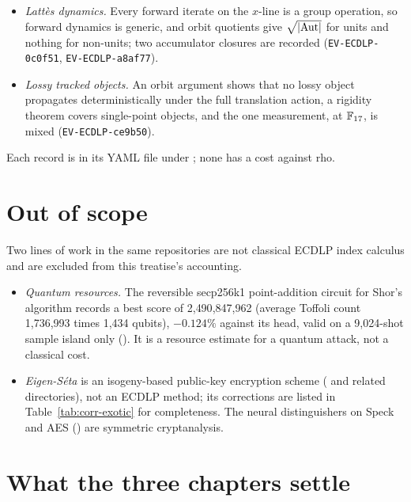 \begin{itemize}
  function is a canonical primitive computable from the point; whether it
  exposes $k$ cheaply is an unreviewed proposal with no measurement.
\item \emph{Latt\`es dynamics.} Every forward iterate on the $x$-line is a group
  operation, so forward dynamics is generic, and orbit quotients give
  $\sqrt{\lvert \mathrm{Aut} \rvert}$ for units and nothing for non-units; two accumulator
  closures are recorded (\texttt{EV-ECDLP-0c0f51}, \texttt{EV-ECDLP-a8af77}).
\item \emph{Lossy tracked objects.} An orbit argument shows that no lossy
  object propagates deterministically under the full translation action, a
  rigidity theorem covers single-point objects, and the one measurement, at
  $\mathbb{F}_{17}$, is mixed (\texttt{EV-ECDLP-ce9b50}).
\end{itemize}
Each record is in its YAML file under
; none has a cost
against rho.

\section{Out of scope}\label{sec:ln-scope}

Two lines of work in the same repositories are not classical ECDLP index
calculus and are excluded from this treatise's accounting.
\begin{itemize}
\item \emph{Quantum resources.} The reversible secp256k1 point-addition
  circuit for Shor's algorithm records a best score of 2{,}490{,}847{,}962
  (average Toffoli count 1{,}736{,}993 times 1{,}434 qubits), $-0.124\%$ against
  its head, valid on a 9{,}024-shot sample island only
  ().
  It is a resource estimate for a quantum attack, not a classical cost.
\item \emph{Eigen-S\'eta} is an isogeny-based public-key encryption scheme
  ( and related
  directories), not an ECDLP method; its corrections are listed in
  Table~\ref{tab:corr-exotic} for completeness. The neural distinguishers on
  Speck and AES () are symmetric
  cryptanalysis.
\end{itemize}

\section{What the three chapters settle}\label{sec:ln-reading}

